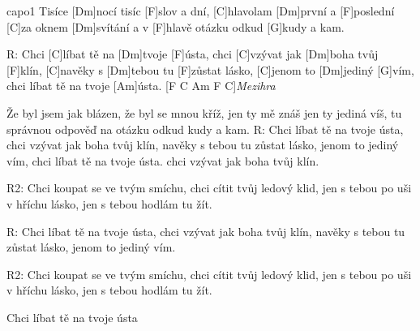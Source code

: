 \hfill capo1
Tisíce [Dm]nocí tisíc [F]slov a dní,
[C]hlavolam [Dm]první a [F]poslední
[C]za oknem [Dm]svítání a v [F]hlavě otázku odkud [G]kudy a kam.

R:
Chci [C]líbat tě na [Dm]tvoje [F]\null ústa,
chci [C]vzývat jak [Dm]boha tvůj [F]klín,
[C]navěky s [Dm]tebou tu [F]zůstat lásko,
[C]jenom to [Dm]jediný [G]vím,
chci líbat tě na tvoje [Am]\null ústa.
[F C Am F C]\null\textit{Mezihra}

Že byl jsem jak blázen, že byl se mnou kříž,
jen ty mě znáš jen ty jediná víš,
tu správnou odpověď na otázku odkud kudy a kam.
\slpc
R:
Chci líbat tě na tvoje ústa,
chci vzývat jak boha tvůj klín,
navěky s tebou tu zůstat lásko,
jenom to jediný vím,
chci líbat tě na tvoje ústa.
chci vzývat jak boha tvůj klín.

R2:
Chci koupat se ve tvým smíchu,
chci cítit tvůj ledový klid,
jen s tebou po uši v hříchu lásko,
jen s tebou hodlám tu žít.

R:
Chci líbat tě na tvoje ústa,
chci vzývat jak boha tvůj klín,
navěky s tebou tu zůstat lásko,
jenom to jediný vím.

R2:
Chci koupat se ve tvým smíchu,
chci cítit tvůj ledový klid,
jen s tebou po uši v hříchu lásko,
jen s tebou hodlám tu žít.

Chci líbat tě na tvoje ústa

